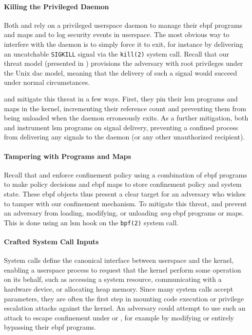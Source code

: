 \paragraph*{Killing the Privileged Daemon}
Both \bpfbox{} and \bpfcontain{} rely on a privileged userspace daemon to manage their
\gls{ebpf} programs and maps and to log security events in userspace. The most obvious way
to interfere with the daemon is to simply force it to exit, for instance by delivering an
uncatchable \texttt{SIGKILL} signal via the \texttt{kill(2)} system call. Recall that our
threat model (presented in ) provisions the adversary with root
privileges under the Unix \gls{dac} model, meaning that the delivery of such a signal would
succeed under normal circumstances.

\bpfbox{} and \bpfcontain{} mitigate this threat in a few ways. First, they pin their
\gls{lsm} programs and maps in the kernel, incrementing their reference count and
preventing them from being unloaded when the daemon erroneously exits. As a further
mitigation, both \bpfbox{} and \bpfcontain{} instrument \gls{lsm} programs on signal
delivery, preventing a confined process from delivering any signals to the daemon (or any
other unauthorized recipient).

\paragraph*{Tampering with Programs and Maps}
Recall that \bpfbox{} and \bpfcontain{} enforce confinement policy using a combination of
\gls{ebpf} programs to make policy decisions and \gls{ebpf} maps to store confinement
policy and system state. These \gls{ebpf} objects thus present a clear target for an
adversary who wishes to tamper with our confinement mechanism. To mitigate this threat,
\bpfbox{} and \bpfcontain{} prevent an adversary from loading, modifying, or unloading
\textit{any} \gls{ebpf} programs or maps. This is done using an \gls{lsm} hook on the
\texttt{bpf(2)} system call.

\paragraph*{Crafted System Call Inputs}
System calls define the canonical interface between userspace and the kernel, enabling
a userspace process to request that the kernel perform some operation on its behalf, such
as accessing a system resource, communicating with a hardware device, or allocating heap
memory. Since many system calls accept parameters, they are often the first step in mounting
code execution or privilege escalation attacks against the kernel. An adversary could attempt
to use such an attack to escape confinement under \bpfbox{} or \bpfcontain{}, for example
by modifying or entirely bypassing their \gls{ebpf} programs.

